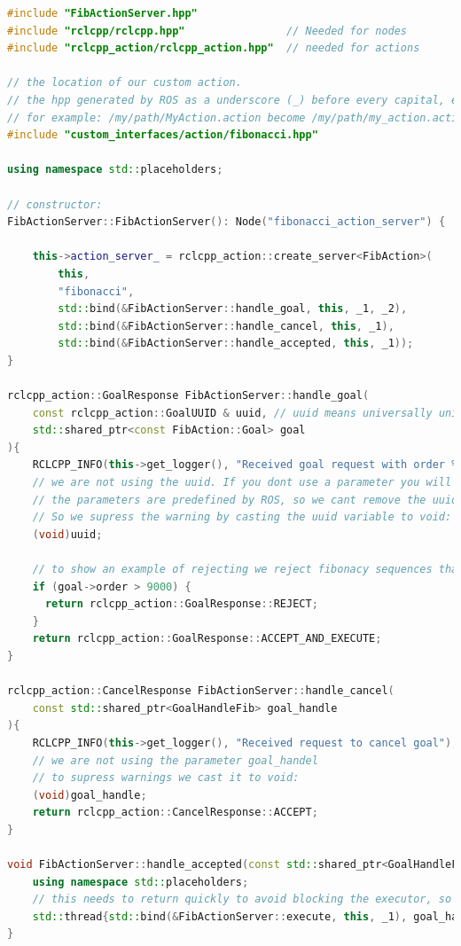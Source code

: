 \begin{lstlisting}[language=C++, caption={ActionServerNode.cpp}, firstnumber=0, label={code:action_server_cpp}]
#include "FibActionServer.hpp"
#include "rclcpp/rclcpp.hpp"                // Needed for nodes
#include "rclcpp_action/rclcpp_action.hpp"  // needed for actions

// the location of our custom action.
// the hpp generated by ROS as a underscore (_) before every capital, expect the first:
// for example: /my/path/MyAction.action become /my/path/my_action.action
#include "custom_interfaces/action/fibonacci.hpp"

using namespace std::placeholders;

// constructor:
FibActionServer::FibActionServer(): Node("fibonacci_action_server") {

    this->action_server_ = rclcpp_action::create_server<FibAction>(
        this,
        "fibonacci",
        std::bind(&FibActionServer::handle_goal, this, _1, _2),
        std::bind(&FibActionServer::handle_cancel, this, _1),
        std::bind(&FibActionServer::handle_accepted, this, _1));
}

rclcpp_action::GoalResponse FibActionServer::handle_goal(
    const rclcpp_action::GoalUUID & uuid, // uuid means universally unique identifier
    std::shared_ptr<const FibAction::Goal> goal
){
    RCLCPP_INFO(this->get_logger(), "Received goal request with order %d", goal->order);
    // we are not using the uuid. If you dont use a parameter you will get a warning.
    // the parameters are predefined by ROS, so we cant remove the uuid parameter.
    // So we supress the warning by casting the uuid variable to void:
    (void)uuid;

    // to show an example of rejecting we reject fibonacy sequences that are over 9000:
    if (goal->order > 9000) {
      return rclcpp_action::GoalResponse::REJECT;
    }
    return rclcpp_action::GoalResponse::ACCEPT_AND_EXECUTE;
}

rclcpp_action::CancelResponse FibActionServer::handle_cancel(
    const std::shared_ptr<GoalHandleFib> goal_handle
){
    RCLCPP_INFO(this->get_logger(), "Received request to cancel goal");
    // we are not using the parameter goal_handel
    // to supress warnings we cast it to void:
    (void)goal_handle;
    return rclcpp_action::CancelResponse::ACCEPT;
}

void FibActionServer::handle_accepted(const std::shared_ptr<GoalHandleFib> goal_handle){
    using namespace std::placeholders;
    // this needs to return quickly to avoid blocking the executor, so spin up a new thread
    std::thread{std::bind(&FibActionServer::execute, this, _1), goal_handle}.detach();
}


\end{lstlisting}
